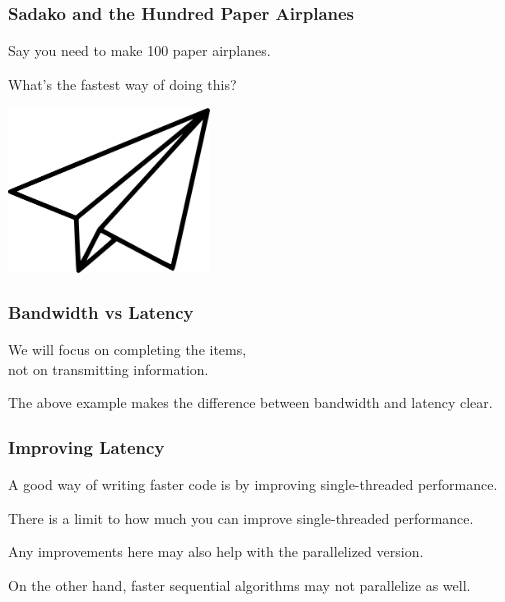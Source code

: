 \begin{frame}
\frametitle{Sadako and the Hundred Paper Airplanes}
\Large

 Say you need to make
100 paper airplanes.

What's the fastest way of doing this?

\begin{center}
\includegraphics[width=0.4\textwidth]{images/paper-airplane.png}
\end{center}

\end{frame}


\begin{frame}
\frametitle{Bandwidth vs Latency}
\Large

\begin{center}
\end{center}

We will focus on completing the items,\\
not on transmitting information.

The above example makes the difference between bandwidth and latency clear.

\end{frame}


\begin{frame}
\frametitle{Improving Latency}
\Large

A good way of writing faster code is by improving single-threaded 
performance. 

There is a limit to how much you can
improve single-threaded performance.

Any improvements here
may also help with the parallelized version. 

On the other hand, faster
sequential algorithms may not parallelize as well. 


\end{frame}




